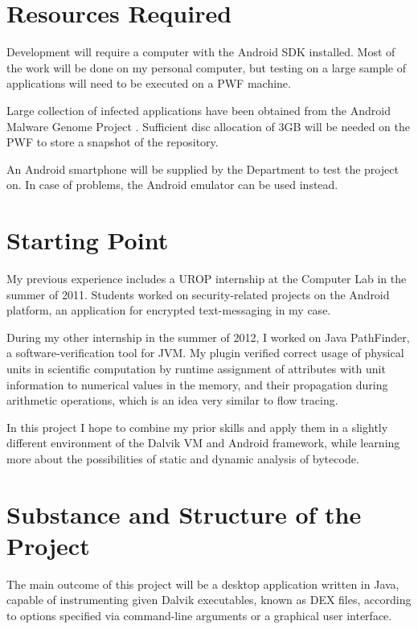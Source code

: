 \documentclass[12pt]{article}
\begin{document}
\section*{Resources Required}

Development will require a computer with the Android SDK installed. Most 
of the work will be done on my personal computer, but testing on a large 
sample of applications will need to be executed on a PWF machine. 

Large collection of infected applications have been obtained from the
Android Malware Genome Project \cite{www.malgenomeproject.org}. 
Sufficient disc allocation of 3GB will be needed on the PWF to store
a snapshot of the repository. 

An Android smartphone will be supplied by the Department to test 
the project on. In case of problems, the Android emulator can be used 
instead.

\section*{Starting Point}

My previous experience includes a UROP internship at the Computer Lab
in the summer of 2011. Students worked on security-related projects on
the Android platform, an application for encrypted text-messaging in my
case.

During my other internship in the summer of 2012, I worked on Java PathFinder,
a software-verification tool for JVM. My plugin verified correct usage of 
physical units in scientific computation by runtime assignment of attributes 
with unit information to numerical values in the memory, and their propagation 
during arithmetic operations, which is an idea very similar to flow tracing. 

In this project I hope to combine my prior skills and apply them in a 
slightly different environment of the Dalvik VM and Android framework,
while learning more about the possibilities of static and dynamic analysis
of bytecode.

\section*{Substance and Structure of the Project}

The main outcome of this project will be a desktop application written 
in Java, capable of instrumenting given Dalvik executables, known as DEX
files, according to options specified via command-line arguments or 
a graphical user interface.
\end{document}
